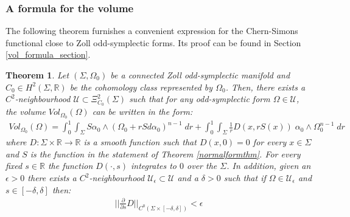 \documentclass[11pt]{amsart}
\theoremstyle{plain}
\newtheorem{theorem}{Theorem}[section]
\theoremstyle{definition}
\theoremstyle{remark}
\newtheorem{remark}[theorem]{Remark}
\begin{document}
\subsubsection{A formula for the volume}
The following theorem furnishes a convenient expression for the Chern-Simons functional close to Zoll odd-symplectic forms. Its proof can be found in Section \ref{vol_formula_section}.
\begin{theorem}\label{Volume_formula}
Let $(\Sigma,\Omega_0)$ be a connected Zoll odd-symplectic manifold and $C_0 \in H^2(\Sigma,\mathbb{R})$ be the cohomology class represented by $\Omega_0$. Then, there exists a $C^2$-neighbourhood $\mathcal{U} \subset \Xi^2_{C_0}(\Sigma)$ such that for any odd-symplectic form $\Omega \in \mathcal{U}$, the volume $Vol_{\Omega_0}(\Omega)$ can be written in the form:
\begin{align}\label{vol_of_omega}
Vol_{\Omega_0}(\Omega) =   \int^1_0 \int_{\Sigma}  S\alpha_0 \wedge (\Omega_0 +rSd\alpha_0)^{n-1} \; dr + \int^1_0  \int_{\Sigma} \frac{1}{r} D(x,rS(x)) \; \alpha_0 \wedge \Omega_0^{n-1} \; dr
\end{align}
where $D: \Sigma \times \mathbb{R}  \rightarrow \mathbb{R}$ is a smooth function such that $D(x,0) = 0$ for every $x \in \Sigma$ and $S$ is the function in the statement of Theorem \ref{normalformthm}. For every fixed $s \in \mathbb{R}$ the function $D(\cdot, s)$ integrates to $0$ over the $\Sigma$. In addition, given an $\epsilon>0$ there exists a 
$C^2$-neighbourhood $\mathcal{U}_{\epsilon} \subset \mathcal{U}$ and a $\delta >0$ such that if $\Omega \in \mathcal{U}_{\epsilon}$ and $s \in [-\delta,\delta]$ then:
\begin{align}\label{volume_formula_bounds}
 \Big|\Big|\frac{\partial}{\partial s}D \Big|\Big|_{C^0(\Sigma \times [-\delta, \delta])} < \epsilon
\end{align}
\end{theorem}
\end{document}
